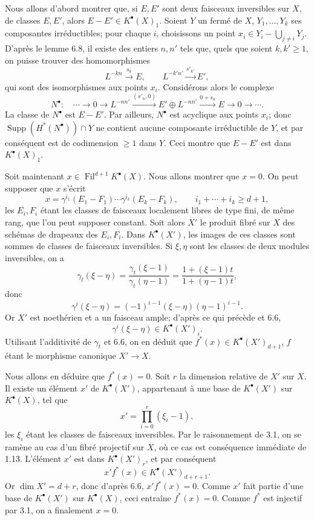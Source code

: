 \documentclass[11pt]{article}
\newcommand{\Fil}{\operatorname{Fil}}
\providecommand{\Supp}{\operatorname{Supp}}
\begin{document}
Nous allons d'abord montrer que, si \(E,E'\) sont deux faisceaux inversibles sur \(X\), de classes \(E,E'\), alors \(E-E'\in K^\bullet(X)_1\). Soient \(Y\) un fermé de \(X\), \(Y_1,\ldots,Y_k\) ses composantes irréductibles; pour chaque \(i\), choisissons un point \(x_i\in Y_i-\bigcup_{j\neq i}Y_j\). D'après le lemme 6.8, il existe des entiers \(n,n'\) tels que, quels que soient \(k,k'\geq1\), on puisse trouver des homomorphismes
\[
  L^{-kn}\xrightarrow{s_k}E,
  \qquad
  L^{-k'n'}\xrightarrow{s'_{k'}}E',
\]
qui sont des isomorphismes aux points \(x_i\). Considérons alors le complexe
\[
  N^\bullet:\quad
  \cdots\longrightarrow 0\longrightarrow
  L^{-nn'}\xrightarrow{(s'_n,0)}
  E'\oplus L^{-nn'}\xrightarrow{0+s_n}
  E\longrightarrow 0\longrightarrow\cdots .
\]
La classe de \(N^\bullet\) est \(E-E'\). Par ailleurs, \(N^\bullet\) est acyclique aux points \(x_i\); donc \(\Supp(H^*(N^\bullet))\cap Y\) ne contient aucune composante irréductible de \(Y\), et par conséquent est de codimension \(\geq1\) dans \(Y\). Ceci montre que \(E-E'\) est dans \(K^\bullet(X)_1\).

Soit maintenant \(x\in\Fil^{d+1}K^\bullet(X)\). Nous allons montrer que \(x=0\). On peut supposer que \(x\) s'écrit
\[
  x=\gamma^{i_1}(E_1-F_1)\cdots\gamma^{i_k}(E_k-F_k),
  \qquad i_1+\cdots+i_k\geq d+1,
\]
les \(E_i,F_i\) étant les classes de faisceaux localement libres de type fini, de même rang, que l'on peut supposer constant. Soit alors \(X'\) le produit fibré sur \(X\) des schémas de drapeaux des \(E_i,F_i\). Dans \(K^\bullet(X')\), les images de ces classes sont sommes de classes de faisceaux inversibles. Si \(\xi,\eta\) sont les classes de deux modules inversibles, on a
\[
  \gamma_t(\xi-\eta)=
  \frac{\gamma_t(\xi-1)}{\gamma_t(\eta-1)}
  =
  \frac{1+(\xi-1)t}{1+(\eta-1)t},
\]
donc
\[
  \gamma^i(\xi-\eta)=(-1)^{i-1}(\xi-\eta)(\eta-1)^{i-1}.
\]
Or \(X'\) est noethérien et a un faisceau ample; d'après ce qui précède et 6.6,
\[
  \gamma^i(\xi-\eta)\in K^\bullet(X')_i.
\]
Utilisant l'additivité de \(\gamma_t\) et 6.6, on en déduit que \(f^*(x)\in K^\bullet(X')_{d+1}\), \(f\) étant le morphisme canonique \(X'\to X\).

Nous allons en déduire que \(f^*(x)=0\). Soit \(r\) la dimension relative de \(X'\) sur \(X\). Il existe un élément \(x'\) de \(K^\bullet(X')\), appartenant à une base de \(K^\bullet(X')\) sur \(K^\bullet(X)\), tel que
\[
  x'=\prod_{i=0}^{r}(\xi_i-1),
\]
les \(\xi_i\) étant les classes de faisceaux inversibles. Par le raisonnement de 3.1, on se ramène au cas d'un fibré projectif sur \(X\), où ce cas est conséquence immédiate de 1.13. L'élément \(x'\) est dans \(K^\bullet(X')_r\), et par conséquent
\[
  x'f^*(x)\in K^\bullet(X')_{d+r+1}.
\]
Or \(\dim X'=d+r\), donc d'après 6.6, \(x'f^*(x)=0\). Comme \(x'\) fait partie d'une base de \(K^\bullet(X')\) sur \(K^\bullet(X)\), ceci entraîne \(f^*(x)=0\). Comme \(f^*\) est injectif par 3.1, on a finalement \(x=0\).
\end{document}
